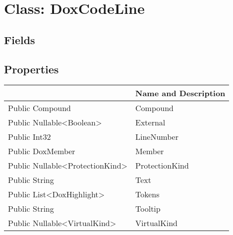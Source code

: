 \documentclass[11pt, oneside, a4paper]{book}
\begin{document}
\hypertarget{SoftwareEngineeringTools.{}Documentation.{}DoxCodeLine}{}
\section{Class: DoxCodeLine}

\subsection{Fields}

\subsection{Properties}
\begin{center}
\begin{tabular}{| p{3cm} | p{12cm} | }
\hline
\textbf{ } & \textbf{ Name and Description}\\
\hline
 Public  Compound &  Compound\hypertarget{SoftwareEngineeringTools.{}Documentation.{}DoxCodeLine.{}Compound}{}\\
\hline
 Public  Nullable<Boolean> &  External\hypertarget{SoftwareEngineeringTools.{}Documentation.{}DoxCodeLine.{}External}{}\\
\hline
 Public  Int32 &  LineNumber\hypertarget{SoftwareEngineeringTools.{}Documentation.{}DoxCodeLine.{}LineNumber}{}\\
\hline
 Public  DoxMember &  Member\hypertarget{SoftwareEngineeringTools.{}Documentation.{}DoxCodeLine.{}Member}{}\\
\hline
 Public  Nullable<ProtectionKind> &  ProtectionKind\hypertarget{SoftwareEngineeringTools.{}Documentation.{}DoxCodeLine.{}ProtectionKind}{}\\
\hline
 Public  String &  Text\hypertarget{SoftwareEngineeringTools.{}Documentation.{}DoxCodeLine.{}Text}{}\\
\hline
 Public  List<DoxHighlight> &  Tokens\hypertarget{SoftwareEngineeringTools.{}Documentation.{}DoxCodeLine.{}Tokens}{}\\
\hline
 Public  String &  Tooltip\hypertarget{SoftwareEngineeringTools.{}Documentation.{}DoxCodeLine.{}Tooltip}{}\\
\hline
 Public  Nullable<VirtualKind> &  VirtualKind\hypertarget{SoftwareEngineeringTools.{}Documentation.{}DoxCodeLine.{}VirtualKind}{}\\
\hline
\end{tabular}
\end{center}
\end{document}
